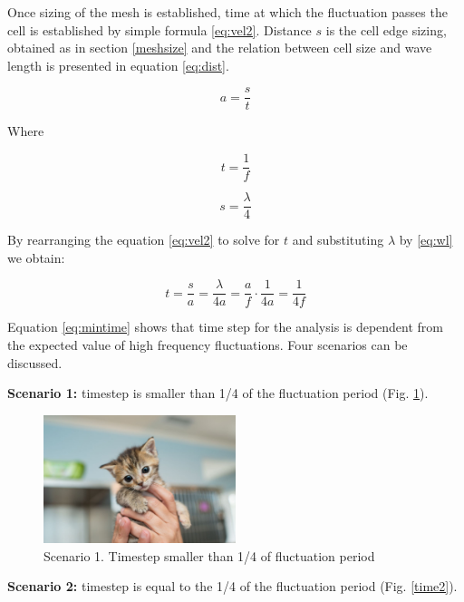 Once sizing of the mesh is established, time at which the fluctuation passes the cell is established by simple formula \ref{eq:vel2}. Distance $s$ is the cell edge sizing, obtained as in section \ref{meshsize} and the relation between cell size and wave length is presented in equation \ref{eq:dist}.

\begin{equation} \label{eq:vel2}
a = \frac{s}{t}
\end{equation}

Where

\begin{equation} \label{eq:time}
t = \frac{1}{f}
\end{equation}

\begin{equation} \label{eq:dist}
s = \frac{\lambda}{4}
\end{equation}

By rearranging the equation \ref{eq:vel2} to solve for $t$ and substituting $\lambda$ by \ref{eq:wl} we obtain:

\begin{equation} \label{eq:mintime}
t = \frac{s}{a} = \frac{\lambda}{4a} = \frac{a}{f} \cdot \frac{1}{4a} = \frac{1}{4f}
\end{equation}

Equation \ref{eq:mintime} shows that time step for the analysis is dependent from the expected value of high frequency fluctuations. Four scenarios can be discussed.

\textbf{Scenario 1:} timestep is smaller than 1/4 of the fluctuation period (Fig. \ref{time1}).

\begin{figure}[h!]
\centering %
\includegraphics[width=0.5\textwidth]{Pictures/kitten-placeholder.jpg}
\caption{Scenario 1. Timestep smaller than 1/4 of fluctuation period}
\label{time1}
\end{figure}

\textbf{Scenario 2:} timestep is equal to the  1/4 of the fluctuation period (Fig. \ref{time2}).


